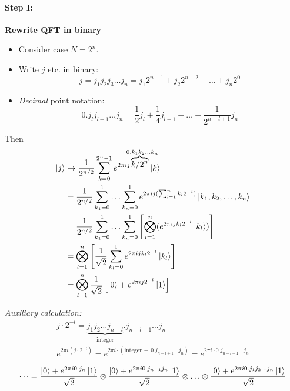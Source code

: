 \documentclass[a4paper, 12pt]{article}
\theoremstyle{plain}
\theoremstyle{definition}
\theoremstyle{remark}
\begin{document}
\paragraph{Step I:}\textbf{Rewrite QFT in binary}
\begin{itemize}
  \item Consider case $N=2^n$.
  \item Write $j$ etc. in binary:
    \begin{equation*}
      j = j_1j_2j_3\ldots j_n = j_1 2^{n-1}+j_2 2^{n-2}+\ldots+j_n 2^0
    \end{equation*}
  \item \emph{Decimal} point notation:
    \begin{equation*}
      0.j_l j_{l+1} \ldots j_n = \frac{1}{2}j_l + \frac{1}{4}j_{l+1} + \ldots + \frac{1}{2^{n-l+1}}j_n
    \end{equation*}
\end{itemize}

Then
\begin{align*}
  \ket{j} &\mapsto \frac{1}{2^{n/2}} \sum_{k=0}^{2^n-1} e^{2\pi ij\overbrace{k/2^n}^{\mathclap{\scriptstyle =0.k_1 k_2\ldots k_n}}}\ket{k} \\
  &= \frac{1}{2^{n/2}} \sum_{k_1 = 0}^1 \ldots \sum_{k_n = 0}^1 e^{2 \pi i j (\sum_{l=1}^n k_l 2^{-l})} \ket{k_1, k_2, \ldots ,k_n}\\
  &= \frac{1}{2^{n/2}} \sum_{k_1 = 0}^1 \ldots \sum_{k_n = 0}^1 \left[\bigotimes_{l=1}^n (e^{2\pi i j k_l 2^{-l}} \ket{k_l})\right]\\
  &= \bigotimes_{l=1}^n \left[ \frac{1}{\sqrt{2}} \sum_{k_l = 0}^1 e^{2\pi i j k_l 2^{-l}} \ket{k_l} \right] \\
  &= \bigotimes_{l=1}^n \frac{1}{\sqrt{2}} \left[  \ket{0} +{e^{2\pi i j 2^{-l}}} \ket{1} \right]
\end{align*}

\emph{Auxiliary calculation:}
\begin{gather*}
  j\cdot 2^{-l} = \underbrace{j_1 j_2 \ldots j_{n-l}}_{\text{integer}}.j_{n-l+1}\ldots j_n \\
  e^{2\pi i (j \cdot 2^{-l})} = e^{2\pi i \cdot (\text{integer}\,+\, 0.j_{n-l+1}\ldots j_n)} = e^{2\pi i \cdot 0.j_{n-l+1}\ldots j_n}
\end{gather*}

\begin{align*}
  \cdots = \frac{\ket{0}+e^{2\pi i 0.j_n} \ket{1}}{\sqrt{2}} \otimes \frac{\ket{0}+e^{2\pi i 0.j_{n-1}j_n} \ket{1}}{\sqrt{2}} \otimes \ldots \otimes \frac{\ket{0}+e^{2\pi i 0.j_1j_2\ldots j_n} \ket{1}}{\sqrt{2}}
\end{align*}
\end{document}
